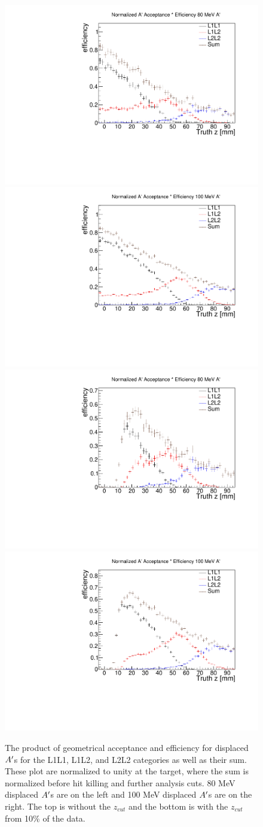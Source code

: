 \begin{figure}[t]
    \centering
    \includegraphics[width=.45\textwidth]{figs/selection/ap_80MeV_eff_norm.pdf}
    \includegraphics[width=.45\textwidth]{figs/selection/ap_100MeV_eff_norm.pdf}
    \includegraphics[width=.45\textwidth]{figs/selection/ap_80MeV_eff_norm_zcut.pdf}
    \includegraphics[width=.45\textwidth]{figs/selection/ap_100MeV_eff_norm_zcut.pdf}
    \caption{The product of geometrical acceptance and efficiency for displaced $A^\prime$s for the L1L1, L1L2, and L2L2 categories as well as their sum. These plot are normalized to unity at the target, where the sum is normalized before hit killing and further analysis cuts. 80 MeV displaced $A^\prime$s are on the left and 100 MeV displaced $A^\prime$s are on the right. The top is without the $z_{cut}$ and the bottom is with the $z_{cut}$ from 10\% of the data.}
    \label{fig:eff2}
\end{figure}

